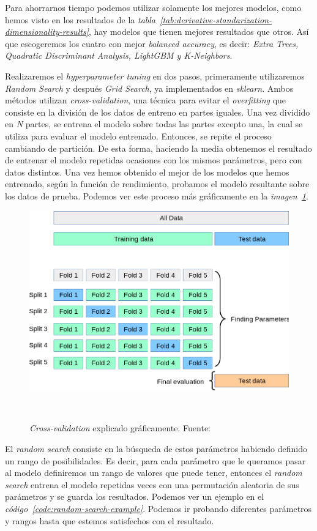 Para ahorrarnos tiempo podemos utilizar solamente los mejores modelos, como hemos visto en los resultados de la \textit{tabla\ \ref{tab:derivative-standarization-dimensionality-results}}, hay modelos que tienen mejores resultados que otros. Así que escogeremos los cuatro con mejor \textit{balanced accuracy}, es decir: \textit{Extra Trees, Quadratic Discriminant Analysis, LightGBM y K-Neighbors}.

Realizaremos el \textit{hyperparameter tuning} en dos pasos, primeramente utilizaremos \textit{Random Search} y después \textit{Grid Search}, ya implementados en \textit{sklearn}.
Ambos métodos utilizan \textit{cross-validation}, una técnica para evitar el \textit{overfitting} que consiste en la división de los datos de entreno en partes iguales.
Una vez dividido en \textit{N} partes, se entrena el modelo sobre todas las partes excepto una, la cual se utiliza para evaluar el modelo entrenado. Entonces, se repite el 
proceso cambiando de partición. De esta forma, haciendo la media obtenemos el resultado de entrenar el modelo repetidas ocasiones con los mismos parámetros, pero con datos 
distintos. Una vez hemos obtenido el mejor de los modelos que hemos entrenado, según la función de rendimiento, probamos el modelo resultante sobre los datos de prueba.
Podemos ver este proceso más gráficamente en la \textit{imagen\ \ref{fig:cross-validation}}.

\begin{figure}[!h]
    \centering
    \includegraphics[width=0.7\linewidth]{media/images/cross-validation.png}
    \caption{\textit{Cross-validation} explicado gráficamente. Fuente:\ \cite{31Crossv20:online}}\ \label{fig:cross-validation}
\end{figure}


El \textit{random search} consiste en la búsqueda de estos parámetros habiendo definido un rango de posibilidades. Es decir, para cada parámetro que le queramos
pasar al modelo definiremos un rango de valores que puede tener, entonces el \textit{random search} entrena el modelo repetidas veces con una permutación aleatoria de sus 
parámetros y se guarda los resultados. Podemos ver un ejemplo en el \textit{código\ \ref{code:random-search-example}}.
Podemos ir probando diferentes parámetros y rangos hasta que estemos satisfechos con el resultado.


